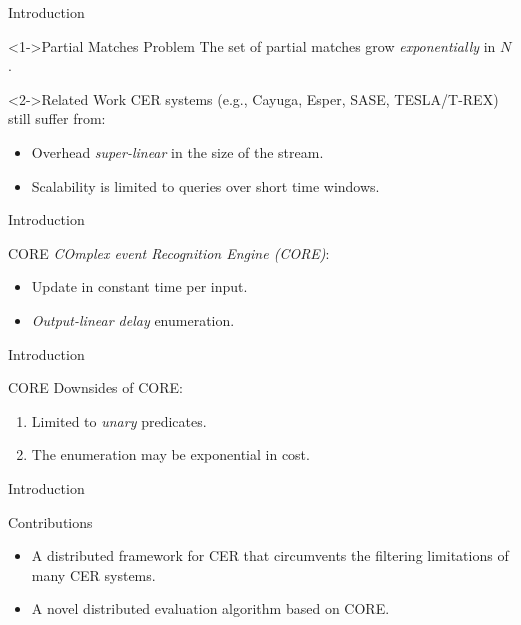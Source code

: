 \documentclass[xcolor=pdftex,dvipsnames,table]{beamer}
\begin{document}

\begin{frame}{Introduction}
 \begin{block}<1->{Partial Matches Problem}
   The set of partial matches grow \emph{exponentially} in $N$.
 \end{block}
 \begin{block}<2->{Related Work}
    CER systems (e.g., Cayuga, Esper, SASE, TESLA/T-REX) still suffer from:
    \begin{itemize}
      \item Overhead \emph{super-linear} in the size of the stream.
      \item Scalability is limited to queries over short time windows.
    \end{itemize}
  \end{block}
\end{frame}


\begin{frame}{Introduction}
  \begin{block}{CORE}
   \emph{COmplex event Recognition Engine (CORE)\cite{core}}:
   \begin{itemize}
      \item Update in constant time per input.
      \item \emph{Output-linear delay} enumeration.
   \end{itemize}
 \end{block}
\end{frame}

\begin{frame}{Introduction}
  \begin{block}{CORE}
    Downsides of CORE:
   \begin{enumerate}
     \item Limited to \emph{unary} predicates.
     \pause
     \item The enumeration may be exponential in cost.
   \end{enumerate}
 \end{block}
\end{frame}


\begin{frame}{Introduction}
  \begin{block}{Contributions}
   \begin{itemize}
     \item A distributed framework for CER that circumvents the filtering limitations of many CER systems.
     \pause
     \item A novel distributed evaluation algorithm based on CORE.
   \end{itemize}
 \end{block}
\end{frame}
\end{document}
